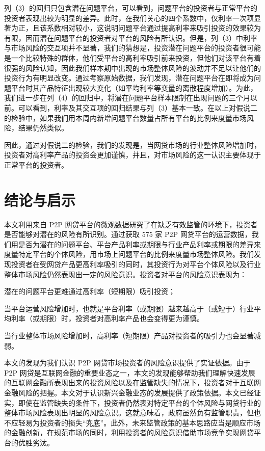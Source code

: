 \documentclass[lang=cn,11pt]{elegantpaper}
\begin{document}
列（3）的回归只包含潜在问题平台，可以看到，问题平台的投资者与正常平台的投资者表现出较为明显的差异。此时，在我们关心的四个系数中，仅利率一次项显著为正，且该系数相对较小，这说明问题平台通过提高利率来吸引投资的效果较为有限，因而潜在问题平台的投资者对平台的风险有所认识。但是，列（3）中利率与市场风险的交互项并不显著，我们的猜想是，投资潜在问题平台的投资者很可能是一个比较特殊的群体，他们受平台的高利率吸引前来投资，但他们对该平台有着很强的风险认知，因此我们样本期中出现的市场整体风险的波动并不足以让他们的投资行为有明显改变。通过考察原始数据，我们发现，潜在问题平台在即将成为问题平台时其产品特征出现较大变化（如平均利率等变量的离散程度增加）。为此，我们进一步在列（4）的回归中，将潜在问题平台样本限制在出现问题的三个月以前。可以看到，利率及其交互项的回归结果与列（3）基本一致。在以上对假说二的检验中，如果我们用本周内新增问题平台数量占所有平台的比例来度量市场风险，结果仍然类似。

因此，通过对假说二的检验，我们的发现是，当网贷市场的行业整体风险增加时，投资者对高利率产品的投资会更加谨慎，并且，对市场风险的这一认识主要体现于正常平台的投资者。


\section{结论与启示}

本文利用来自 P2P 网贷平台的微观数据研究了在缺乏有效监管的环境下，投资者是否能够对潜在的风险有所识别。通过获取 575 家 P2P 网贷平台的运营数据，我们用是否为潜在的问题平台、平台产品利率或期限与行业产品利率或期限的差异来度量特定平台的个体风险，用市场上问题平台的比例来度量市场整体风险。我们发现投资者在受网贷产品更高利率吸引的同时，其投资行为对平台个体风险以及行业整体市场风险仍然表现出一定的风险意识。投资者对平台的风险意识表现为：
\begin{enumerate*}[label=（\arabic*）]
\item 潜在的问题平台更难通过高利率（短期限）吸引投资；
\item 当平台运营风险增加时，也就是平台利率（或期限）越来越高于（或短于）行业平均利率（或期限）时，投资者对高利率产品也会变得更为谨慎。
\item 当行业整体市场风险增加时，高利率（短期限）产品对投资者的吸引力也会显著减弱。    
\end{enumerate*}

本文的发现为我们认识 P2P 网贷市场投资者的风险意识提供了实证依据。由于 P2P 网贷是互联网金融的重要业态之一，本文的发现能够帮助我们理解快速发展的互联网金融所表现出来的投资风险以及在监管缺失的情况下，投资者对于互联网金融风险的把握。本文对于认识新兴金融业态的发展提供了政策依据。本文已经证实，即使在监管缺失的条件下，投资者仍然表对特定平台的个体风险与网贷行业的整体市场风险表现出明显的风险意识。这就意味着，政府虽然负有监管职责，但也不应轻易为投资者的损失“兜底”。此外，未来监管政策的基本思路应当是顺应市场的金融创新，在规范市场的同时，利用投资者的风险意识借助市场竞争实现网贷平台的优胜劣汰。
\end{document}
